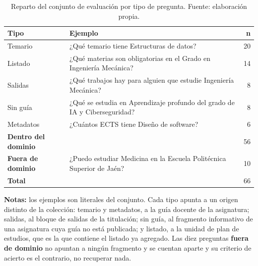 
\begin{table}[htbp]
  \centering
  \small
  \caption{Reparto del conjunto de evaluación por tipo de pregunta. Fuente: elaboración propia.}
  \label{tab:conjunto_evaluacion}
  \begin{tabularx}{\textwidth}{@{}l X r@{}}
    \toprule
    \textbf{Tipo} & \textbf{Ejemplo}                                                     & \textbf{n} \\
    \midrule
    Temario       & ¿Qué temario tiene Estructuras de datos?                              & 20         \\
    Listado       & ¿Qué materias son obligatorias en el Grado en Ingeniería Mecánica?    & 14         \\
    Salidas       & ¿Qué trabajos hay para alguien que estudie Ingeniería Mecánica?       & 8          \\
    Sin guía & ¿Qué se estudia en Aprendizaje profundo del grado de IA y Ciberseguridad? & 8 \\
    Metadatos     & ¿Cuántos ECTS tiene Diseño de software?                               & 6          \\
    \midrule
    \textbf{Dentro del dominio} & & 56 \\
    \midrule
    \textbf{Fuera de dominio} & ¿Puedo estudiar Medicina en la Escuela Politécnica Superior de Jaén? & 10 \\
    \midrule
    \textbf{Total} &                                                                     & 66 \\
    \bottomrule
  \end{tabularx}
  \begin{minipage}{0.95\textwidth}
    \vspace{4pt}
    \tiny
    \textbf{Notas:} los ejemplos son literales del conjunto. Cada tipo apunta a un origen
    distinto de la colección: temario y metadatos, a la guía docente de la asignatura;
    salidas, al bloque de salidas de la titulación; sin guía, al fragmento informativo de una
    asignatura cuya guía no está publicada; y listado, a la unidad de plan de estudios, que es
    la que contiene el listado ya agregado. Las diez preguntas
    \textbf{fuera de dominio} no apuntan a ningún fragmento y se cuentan aparte y su criterio de acierto es el contrario, no recuperar nada.
  \end{minipage}
\end{table}
